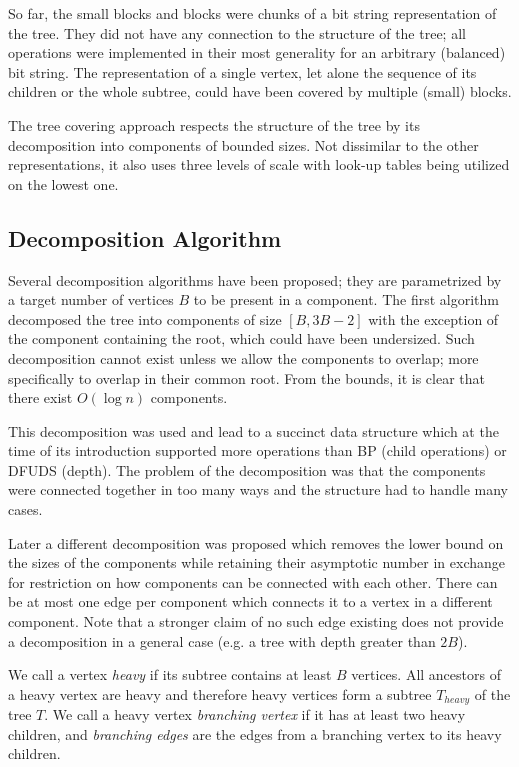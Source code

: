 So far, the small blocks and blocks were chunks of a bit string representation of the tree.
They did not have any connection to the structure of the tree; all operations were implemented in their most generality for an arbitrary (balanced) bit string.
The representation of a single vertex, let alone the sequence of its children or the whole subtree, could have been covered by multiple (small) blocks.

The tree covering approach respects the structure of the tree by its decomposition into components of bounded sizes.
Not dissimilar to the other representations, it also uses three levels of scale with look-up tables being utilized on the lowest one.

\subsection{Decomposition Algorithm}

Several decomposition algorithms have been proposed; they are parametrized by a target number of vertices $B$ to be present in a component.
The first algorithm  decomposed the tree into components of size $[B, 3 B - 2]$ with the exception of the component containing the root, which could have been undersized.
Such decomposition cannot exist unless we allow the components to overlap; more specifically to overlap in their common root.
From the bounds, it is clear that there exist $O(\log n)$ components.

This decomposition was used and lead to a succinct data structure which at the time of its introduction supported more operations than BP (child operations) or DFUDS (depth).
The problem of the decomposition was that the components were connected together in too many ways and the structure had to handle many cases.

Later a different decomposition was proposed which removes the lower bound on the sizes of the components while retaining their asymptotic number in exchange for restriction on how components can be connected with each other.
There can be at most one edge per component which connects it to a vertex in a different component.
Note that a stronger claim of no such edge existing does not provide a decomposition in a general case (e.g. a tree with depth greater than $2 B$).

We call a vertex \emph{heavy} if its subtree contains at least $B$ vertices.
All ancestors of a heavy vertex are heavy and therefore heavy vertices form a subtree $T_{heavy}$ of the tree $T$.
We call a heavy vertex \emph{branching vertex} if it has at least two heavy children, and \emph{branching edges} are the edges from a branching vertex to its heavy children.

